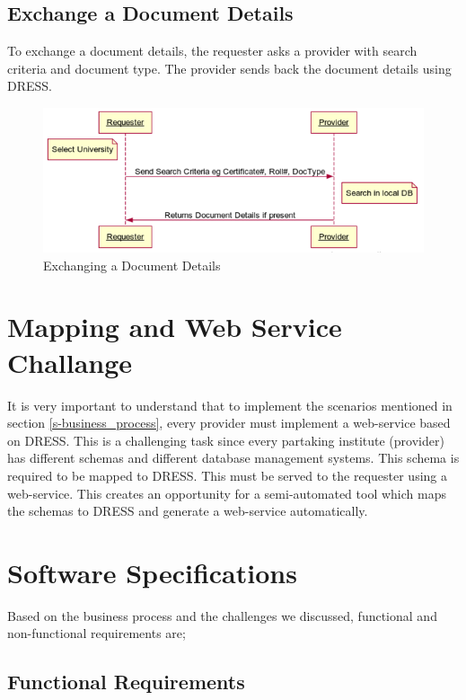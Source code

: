 \documentclass[12pt,a4paper,oneside]{book}
\begin{document}
    \subsection{Exchange a Document Details}
    To exchange a document details, the requester asks a provider with search criteria and document type. The provider sends back the document details using DRESS.

\begin{figure}[!htp]
  \centering
  \includegraphics[width=14cm]{sq_exchange_doc.png}
  \caption{Exchanging a Document Details}
  \label{fig:sq_exchange_doc}
\end{figure}

\section{Mapping and Web Service Challange}

It is very important to understand that to implement the scenarios mentioned in section \ref{s-business_process}, every provider must implement a web-service based on DRESS. This is a challenging task since every partaking institute (provider) has different schemas and different database management systems. This schema is required to be mapped to DRESS. This must be served to the requester using a web-service. This creates an opportunity for a semi-automated tool which maps the schemas to DRESS and generate a web-service automatically.

\section{Software Specifications}
Based on the business process and the challenges we discussed, functional and non-functional requirements are;

    \subsection{Functional Requirements}
\end{document}
